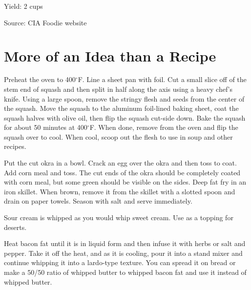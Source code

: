 \documentclass[letterpaper]{recipePMG}
\renewcommand{\deg}{$^\circ$}
\begin{document}
Yield: 2 cups

Source: CIA Foodie website

\chapter{  More of an Idea than a Recipe}



Preheat the oven to 400\deg F.  Line a sheet pan with foil. Cut a small slice off of the stem end of squash and then split in half along the axis using a heavy chef's knife. Using a large spoon, remove the stringy flesh and seeds from the center of the squash.  Move the squash to the aluminum foil-lined baking sheet, coat the squash halves with olive oil, then flip the squash cut-side down. Bake the squash for about 50 minutes at 400\deg F. When done, remove from the oven and flip the squash over to cool.  When cool, scoop out the flesh to use in soup and other recipes.



Put the cut okra in a bowl. Crack an egg over the okra and then toss to coat. Add corn meal and toss.  The cut ends of the okra should be completely coated with corn meal, but some green should be visible on the sides. Deep fat fry in an iron skillet. When brown, remove it from the skillet with a slotted spoon and drain on paper towels. Season with salt and serve immediately.



Sour cream is whipped as you would whip sweet cream.  Use as a topping for deserts.



Heat bacon fat until it is in liquid form and then infuse it with herbs or salt and pepper. Take it off the heat, and as it is cooling, pour it into a stand mixer and continue whipping it into a lardo-type texture. You can spread it on bread or make a 50/50 ratio of whipped butter to whipped bacon fat and use it instead of whipped butter.

\end{document}
